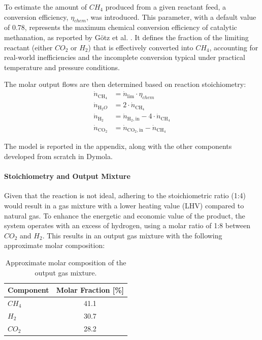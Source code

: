 To estimate the amount of $CH_4$ produced from a given reactant feed, a conversion efficiency, $\eta_{chem}$, was introduced. This parameter, with a default value of 0.78, represents the maximum chemical conversion efficiency of catalytic methanation, as reported by Götz et al. \cite{Gotz2016}. It defines the fraction of the limiting reactant (either $CO_{2}$ or $H_{2}$) that is effectively converted into $CH_{4}$, accounting for real-world inefficiencies and the incomplete conversion typical under practical temperature and pressure conditions.

The molar output flows are then determined based on reaction stoichiometry:
\begin{align*}
\dot{n}_{\mathrm{CH}_4} &= \dot{n}_{\text{lim}} \cdot \eta_{chem} \\
\dot{n}_{\mathrm{H}_2O} &= 2 \cdot \dot{n}_{\mathrm{CH}_4} \\
\dot{n}_{\mathrm{H}_2} &= \dot{n}_{\mathrm{H}_2,\text{in}} - 4 \cdot \dot{n}_{\mathrm{CH}_4} \\
\dot{n}_{\mathrm{CO}_2} &= \dot{n}_{\mathrm{CO}_2,\text{in}} - \dot{n}_{\mathrm{CH}_4}
\end{align*}

The model is reported in the appendix, along with the other components developed from scratch in Dymola.

\paragraph{Stoichiometry and Output Mixture}
Given that the reaction is not ideal, adhering to the stoichiometric ratio (1:4) would result in a gas mixture with a lower heating value (LHV) compared to natural gas. To enhance the energetic and economic value of the product, the system operates with an excess of hydrogen, using a molar ratio of 1:8 between $CO_2$ and $H_2$. This results in an output gas mixture with the following approximate molar composition:
\begin{table}[H]
\centering
\begin{tabular}{lc}
\toprule
\textbf{Component} & \textbf{Molar Fraction [\%]} \\
\midrule
$CH_4$ & 41.1 \\
$H_2$  & 30.7 \\
$CO_2$ & 28.2 \\
\bottomrule
\end{tabular}
\caption{Approximate molar composition of the output gas mixture.}
\end{table}

